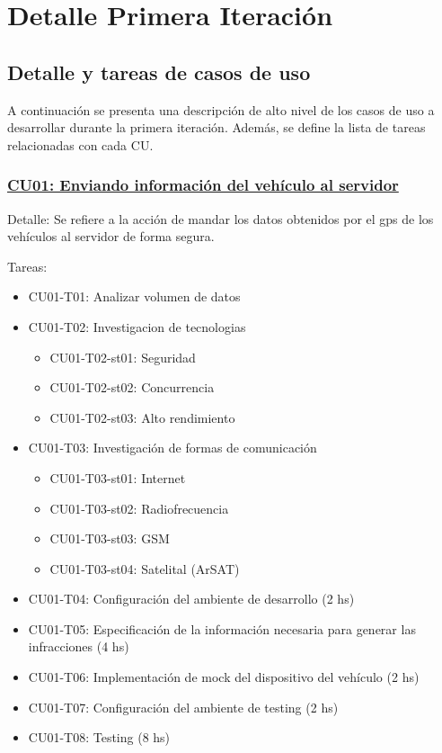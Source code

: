 \section{Detalle Primera Iteración}

\subsection{Detalle y tareas de casos de uso}

A continuación se presenta una descripción de alto nivel de los casos de uso a 
desarrollar durante la primera iteración. Además, se define la lista de tareas 
relacionadas con cada CU.

\subsubsection{\underline{CU01: Enviando información del vehículo al servidor}}

Detalle: Se refiere a la acción de mandar los datos obtenidos por el gps de los 
vehículos al servidor de forma segura.


Tareas: 
\begin{itemize}

\item CU01-T01: Analizar volumen de datos

\item CU01-T02: Investigacion de tecnologias
\begin{itemize}
\item CU01-T02-st01: Seguridad
\item CU01-T02-st02: Concurrencia
\item CU01-T02-st03: Alto rendimiento
\end{itemize}

\item CU01-T03: Investigación de formas de comunicación
\begin{itemize}
\item CU01-T03-st01: Internet
\item CU01-T03-st02: Radiofrecuencia
\item CU01-T03-st03: GSM
\item CU01-T03-st04: Satelital (ArSAT)
\end{itemize}

\item CU01-T04: Configuración del ambiente de desarrollo (2 hs)
\item CU01-T05: Especificación de la información necesaria para generar las infracciones (4 hs)
\item CU01-T06: Implementación de mock del dispositivo del vehículo (2 hs)
\item CU01-T07: Configuración del ambiente de testing (2 hs)
\item CU01-T08: Testing (8 hs)

\end{itemize}

